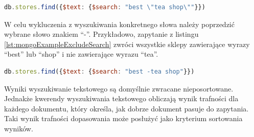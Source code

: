 \begin{lstlisting}[language=JavaScript,
caption={Zapytanie dopasowujące dokładną frazę},
label={lst:mongoExamplePhraseSearch}]
db.stores.find({$text: {$search: "best \"tea shop\""}})
\end{lstlisting}

W celu wykluczenia z wyszukiwania konkretnego słowa należy poprzedzić wybrane słowo znakiem \enquote{-}.
Przykładowo, zapytanie z listingu \ref{lst:mongoExampleExcludeSearch} zwróci wszystkie sklepy zawierające wyrazy \enquote{best} lub \enquote{shop} i nie zawierające wyrazu \enquote{tea}.

\begin{lstlisting}[language=JavaScript,
caption={Zapytanie wykluczające wyraz \enquote{tea}},
label={lst:mongoExampleExcludeSearch}]
db.stores.find({$text: {$search: "best -tea shop"}})
\end{lstlisting}

Wyniki wyszukiwanie tekstowego są domyślnie zwracane nieposortowane. 
Jednakże kwerendy wyszukiwania tekstowego obliczają wynik trafności dla każdego dokumentu, który określa, jak dobrze dokument pasuje do zapytania.
Taki wynik trafności dopasowania może posłużyć jako kryterium sortowania wyników.


